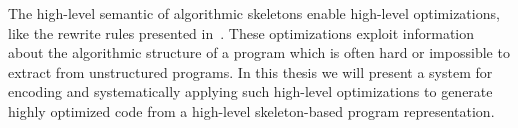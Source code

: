 The high-level semantic of algorithmic skeletons enable high-level optimizations, like the rewrite rules presented in~\cite{Gorlatch00}.
These optimizations exploit information about the algorithmic structure of a program which is often hard or impossible to extract from unstructured programs.
In this thesis we will present a system for encoding and systematically applying such high-level optimizations to generate highly optimized code from a high-level skeleton-based program representation.


%
%
%
%
